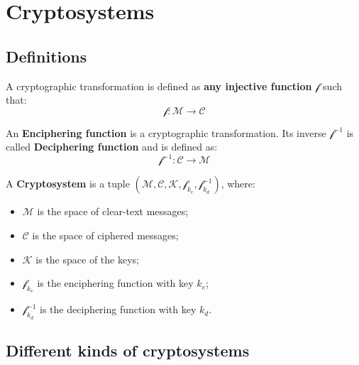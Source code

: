 \section{Cryptosystems}
\subsection{Definitions}
\begin{definition}
    A cryptographic transformation is defined as \textbf{any injective function} $\mathscr{f}$ such that:
    \[\mathscr{f}: \mathcal{M} \rightarrow \mathcal{C}\]
\end{definition}
\begin{definition}
    An \textbf{Enciphering function} is a cryptographic transformation. Its inverse $\mathscr{f}^{-1}$ is called \textbf{Deciphering function} and is defined as:
    \[\mathscr{f}^{-1}: \mathcal{C} \rightarrow \mathcal{M}\]
\end{definition}
\begin{definition}[Cryptosystem]
    A \textbf{Cryptosystem} is a tuple $(\mathcal{M},\mathcal{C}, \mathcal{K}, \mathscr{f}_{k_{e}},\mathscr{f}_{k_{d}}^{-1})$, where:
    \begin{itemize}
        \item $\mathcal{M}$ is the space of clear-text messages;
        \item $\mathcal{C}$ is the space of ciphered messages;
        \item $\mathcal{K}$ is the space of the keys;
        \item $\mathscr{f}_{k_e}$ is the enciphering function with key $k_{e}$;
        \item $\mathscr{f}_{k_d}^{-1}$ is the deciphering function with key $k_{d}$.
    \end{itemize}
\end{definition}

\subsection{Different kinds of cryptosystems}
